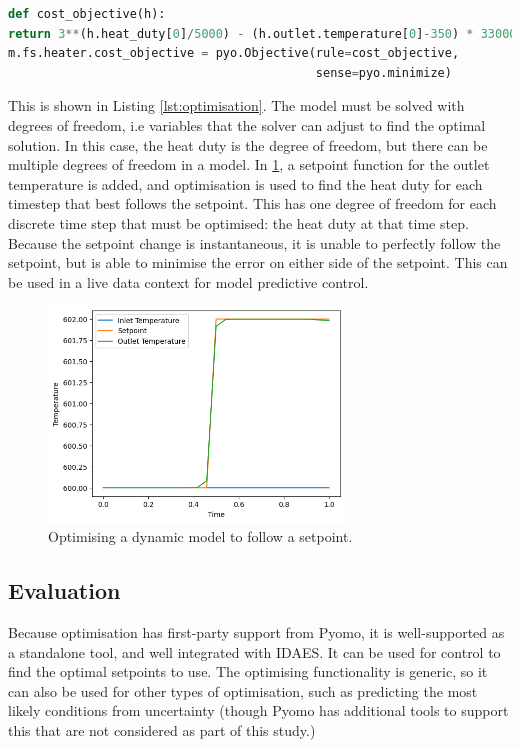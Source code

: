 \documentclass[12pt]{article}
\begin{document}
\begin{lstlisting}[language=Python,caption=Optimising the heater model in IDAES,label=lst:optimisation]
def cost_objective(h):
return 3**(h.heat_duty[0]/5000) - (h.outlet.temperature[0]-350) * 33000
m.fs.heater.cost_objective = pyo.Objective(rule=cost_objective, 
                                           sense=pyo.minimize)
\end{lstlisting}

This is shown in Listing \ref{lst:optimisation}. The model must be solved with degrees of freedom, i.e variables that the solver can adjust to find the optimal solution. In this case, the heat duty is the degree of freedom, but there can be multiple degrees of freedom in a model. 
In \cref{fig:optimisation_dynamics}, a setpoint function for the outlet temperature is added, and optimisation is used to find the heat duty for each timestep that best follows the setpoint. This has one degree of freedom for each discrete time step that must be optimised: the heat duty at that time step. 
Because the setpoint change is instantaneous, it is unable to perfectly follow the setpoint, but is able to minimise the error on either side of the setpoint. 
This  can be used in a live data context for model predictive control.\cite{CITATION_NEEDED}

\begin{figure}
    \centering
    \includegraphics[width=0.7\textwidth]{dynamics_optimisation.png}
    \caption{Optimising a dynamic model to follow a setpoint.}
    \label{fig:optimisation_dynamics}
\end{figure}


\subsection{Evaluation}


Because optimisation has first-party support from Pyomo, it is well-supported as a standalone tool, and well integrated with IDAES.  It can be used for control to find the optimal setpoints to use. The optimising functionality is generic, so it can also be used for other types of optimisation, such as predicting the most likely conditions from uncertainty (though Pyomo has additional tools to support this that are not considered as part of this study.)
\end{document}
